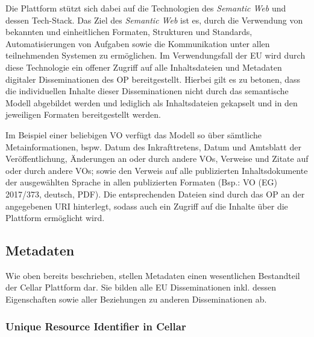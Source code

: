     \medskip
    Die Plattform stützt sich dabei auf die Technologien des \textit{Semantic Web} und dessen Tech-Stack.
    Das Ziel des \textit{Semantic Web} ist es, durch die Verwendung von bekannten und einheitlichen Formaten, Strukturen und Standards, Automatisierungen von Aufgaben sowie die Kommunikation unter allen teilnehmenden Systemen zu ermöglichen. \cite[10]{eu_cellar}   
    Im Verwendungsfall der EU wird durch diese Technologie ein offener Zugriff auf alle Inhaltsdateien und Metadaten digitaler Disseminationen des \ac{OP} bereitgestellt. \cite[7]{eu_cellar}
    Hierbei gilt es zu betonen, dass die individuellen Inhalte dieser Disseminationen nicht durch das semantische Modell abgebildet werden und lediglich als Inhaltsdateien gekapselt und in den jeweiligen Formaten bereitgestellt werden.
    
    \medskip
    Im Beispiel einer beliebigen \acf{VO} verfügt das Modell so über sämtliche Metainformationen, bspw. Datum des Inkrafttretens, Datum und Amtsblatt der Veröffentlichung, Änderungen an oder durch andere \acp{VO}, Verweise und Zitate auf oder durch andere \acp{VO}; sowie den Verweis auf alle publizierten Inhaltsdokumente der ausgewählten Sprache in allen publizierten Formaten
    (Bsp.: \ac{VO} (\acs{EG}) 2017/373, deutsch, PDF).
    Die entsprechenden Dateien sind durch das \acl{OP} an der angegebenen \ac{URI} hinterlegt, sodass auch ein Zugriff auf die Inhalte über die Plattform ermöglicht wird.  

\subsection{Metadaten}
\label{ch:eu_meta}

    Wie oben bereits beschrieben, stellen Metadaten einen wesentlichen Bestandteil der Cellar Plattform dar.
    Sie bilden alle EU Disseminationen inkl. dessen Eigenschaften sowie aller Beziehungen zu anderen Disseminationen ab. 
    
\subsubsection{Unique Resource Identifier in Cellar} \label{cellar_uri}

